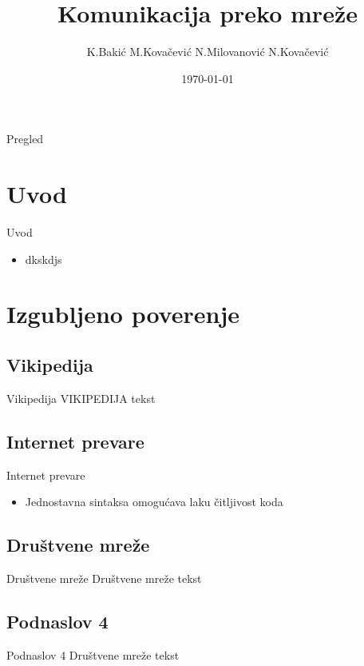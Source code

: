 \documentclass{beamer}
\title{Komunikacija preko mreže}
\author{K.Bakić M.Kovačević N.Milovanović N.Kovačević}
\date{\today}
\begin{document}
\begin{frame}
  \titlepage
\end{frame}


\begin{frame}{Pregled}
 \tableofcontents
\end{frame}

\section{Uvod}
	\begin{frame}{Uvod}
		\begin{itemize}
		\item dkskdjs
		\end{itemize}
	\end{frame}
\section{Izgubljeno poverenje}
	\subsection*{Vikipedija}
		\begin{frame}{Vikipedija}
			VIKIPEDIJA tekst
		\end{frame}

	\subsection*{Internet prevare}
		\begin{frame}{Internet prevare}
			\begin{itemize}
				\item Jednostavna sintaksa omogućava laku čitljivost koda
			\end{itemize}
		\end{frame}
	\subsection*{Društvene mreže}
		\begin{frame}{Društvene mreže}
			Društvene mreže tekst
		\end{frame}
	\subsection*{Podnaslov 4}
		\begin{frame}{Podnaslov 4}
		Društvene mreže tekst
		\end{frame}
\end{document}

